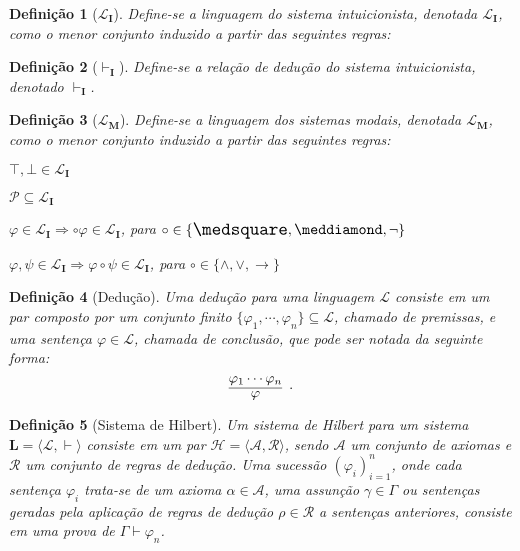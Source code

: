 \documentclass{report}
\newtheorem{definition}{Definição}
\begin{document}
    \begin{definition}[$\mathcal{L}_\mathbf{I}$]
        Define-se a linguagem do sistema intuicionista, denotada $\mathcal{L}_\mathbf{I}$, como o menor conjunto induzido a partir das seguintes regras:
    \end{definition}

    \begin{definition}[$\vdash_\mathbf{I}$]
        Define-se a relação de dedução do sistema intuicionista, denotado $\vdash_\mathbf{I}$.
    \end{definition}


    \begin{definition}[$\mathcal{L}_\mathbf{M}$]
        Define-se a linguagem dos sistemas modais, denotada $\mathcal{L}_\mathbf{M}$, como o menor conjunto induzido a partir das seguintes regras:
        
        $\top, \bot \in \mathcal{L}_\mathbf{I}$
        
        $\mathcal{P} \subseteq \mathcal{L}_\mathbf{I}$
        
        $\varphi \in \mathcal{L}_\mathbf{I} \Rightarrow \circ \varphi \in \mathcal{L}_\mathbf{I}$, para $\circ \in \{\nec, \pos, \neg\}$

        $\varphi, \psi \in \mathcal{L}_\mathbf{I} \Rightarrow \varphi \circ \psi \in \mathcal{L}_\mathbf{I}$, para $\circ \in \{\wedge, \vee, \to\}$
    \end{definition}

    \begin{definition}[Dedução]
        Uma dedução para uma linguagem $\mathcal{L}$ consiste em um par composto por um conjunto finito $\{\varphi_1, \cdots, \varphi_n\} \subseteq \mathcal{L}$, chamado de \emph{premissas}, e uma sentença $\varphi \in \mathcal{L}$, chamada de \emph{conclusão}, que pode ser notada da seguinte forma: $$\infer[.]{\varphi}{\varphi_1 \cdots \varphi_n}$$
    \end{definition}

    \begin{definition}[Sistema de Hilbert]
        Um sistema de Hilbert para um sistema $\mathbf{L} = \langle \mathcal{L}, \vdash\rangle$ consiste em um par $\mathcal{H} = \langle \mathcal{A}, \mathcal{R} \rangle$, sendo $\mathcal{A}$ um conjunto de axiomas e $\mathcal{R}$ um conjunto de regras de dedução. Uma sucessão $(\varphi_i)_{i=1}^n$, onde cada sentença $\varphi_i$ trata-se de um axioma $\alpha \in \mathcal{A}$, uma assunção $\gamma \in \Gamma$ ou sentenças geradas pela aplicação de regras de dedução $\rho \in \mathcal{R}$ a sentenças anteriores, consiste em uma prova de $\Gamma \vdash \varphi_n$.
    \end{definition}
\end{document}
